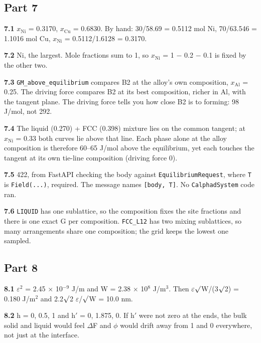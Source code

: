 \documentclass[12pt,a4paper]{article}
\begin{document}
\subsection*{Part 7}
\textbf{7.1} \(x_{\mathrm{Ni}}\) = 0.3170, \(x_{\mathrm{Cu}}\) = 0.6830. By hand: 30/58.69 = 0.5112 mol Ni, 70/63.546 = 1.1016 mol Cu, \(x_{\mathrm{Ni}}\) = 0.5112/1.6128 = 0.3170.

\textbf{7.2} Ni, the largest. Mole fractions sum to 1, so \(x_{\mathrm{Ni}}\) = 1 \(-\) 0.2 \(-\) 0.1 is fixed by the other two.

\textbf{7.3} \texttt{GM\_\allowbreak{}above\_\allowbreak{}equilibrium} compares B2 at the alloy's own composition, \(x_{\mathrm{Al}}\) = 0.25. The driving force compares B2 at its best composition, richer in Al, with the tangent plane. The driving force tells you how close B2 is to forming: 98 J/mol, not 292.

\textbf{7.4} The liquid (0.270) + FCC (0.398) mixture lies on the common tangent; at \(x_{\mathrm{Ni}}\) = 0.33 both curves lie above that line. Each phase alone at the alloy composition is therefore 60--65 J/mol above the equilibrium, yet each touches the tangent at its own tie-line composition (driving force 0).

\textbf{7.5} 422, from FastAPI checking the body against \texttt{EquilibriumRequest}, where \texttt{T} is \texttt{Field(.\allowbreak{}.\allowbreak{}.\allowbreak{})}, required. The message names \texttt{[\textquotedbl{}body\textquotedbl{},\allowbreak{} \textquotedbl{}T\textquotedbl{}]}. No \texttt{CalphadSystem} code ran.

\textbf{7.6} \texttt{LIQUID} has one sublattice, so the composition fixes the site fractions and there is one exact G per composition. \texttt{FCC\_\allowbreak{}L12} has two mixing sublattices, so many arrangements share one composition; the grid keeps the lowest one sampled.


\subsection*{Part 8}
\textbf{8.1} \(\varepsilon ^{2}\) = 2.45 \(\times\) 10\(^{-9}\) J/m and W = 2.38 \(\times\) 10\(^{8}\) J/m\(^{3}\). Then \(\varepsilon \surd\)W/(3\(\surd\)2) = 0.180 J/m\(^{2}\) and 2.2\(\surd\)2 \(\varepsilon\)/\(\surd\)W = 10.0 nm.

\textbf{8.2} h = 0, 0.5, 1 and h\('\) = 0, 1.875, 0. If h\('\) were not zero at the ends, the bulk solid and liquid would feel \(\Delta\)F and \(\phi\) would drift away from 1 and 0 everywhere, not just at the interface.
\end{document}
